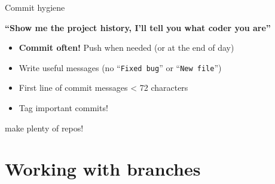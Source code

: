 \documentclass[compress]{beamer}
\begin{document}
\begin{frame}{Commit hygiene}
    \centering

    {\bf ``Show me the project history, I'll tell you what coder you are''}

    \begin{itemize}
        \item<1> {\bf Commit often!} Push when needed (or at the end of day)
        \item<2> Write useful messages (no ``\texttt{Fixed bug}'' or ``\texttt{New
            file}'')
        \item<2> First line of commit messages < 72 characters
        \item<3> Tag important commits!
    \end{itemize}

\end{frame}

\begin{frame}{}
    \centering

    make plenty of repos!
\end{frame}

\section{Working with branches}
\end{document}
